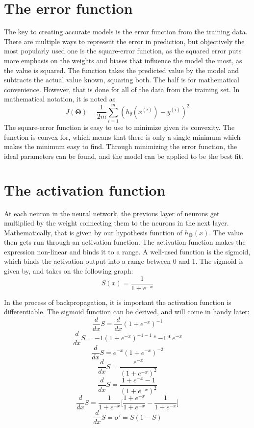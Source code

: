 \documentclass[a4paper,12pt]{article}
\begin{document}
\section{The error function}
The key to creating accurate models is the error function from the training data. There are multiple ways to represent the error in prediction, but objectively the most popularly used one is the square-error function, as the squared error puts more emphasis on the weights and biases that influence the model the most, as the value is squared. The function takes the predicted value by the model and subtracts the actual value known, squaring both. The half is for mathematical convenience. However, that is done for all of the data from the training set. In mathematical notation, it is noted as
\[J(\boldsymbol{\Theta}) = \frac{1}{2m} \sum_{i=1}^m (h_\theta(x^{(i)}) - y^{(i)})^2\]
The square-error function is easy to use to minimize given its convexity. The function is convex for, which means that there is only a single minimum which makes the minimum easy to find. Through minimizing the error function, the ideal parameters can be found, and the model can be applied to be the best fit.

\section{The activation function}
At each neuron in the neural network, the previous layer of neurons get multiplied by the weight connecting them to the neurons in the next layer. Mathematically, that is given by our hypothesis function of $h_{\boldsymbol{\Theta}}(x)$. The value then gets run through an activation function. The activation function makes the expression non-linear and binds it to a range. A well-used function is the sigmoid, which binds the activation output into a range between 0 and 1. The sigmoid is given by, and takes on the following graph:
\[S(x) = \frac{1}{1+e^{-x}}\]

In the process of backpropagation, it is important the activation function is differentiable. The sigmoid function can be derived, and will come in handy later:
\[\frac{d}{dx}S = \frac{d}{dx}(1+e^{-x})^{-1}\]
\[\frac{d}{dx}S = -1(1+e^{-x})^{-1-1} * -1 * e^{-x}\]
\[\frac{d}{dx}S = e^{-x}(1+e^{-x})^{-2}\]
\[\frac{d}{dx}S = \frac{e^{-x}}{(1+e^{-x})^2}\]
\[\frac{d}{dx}S = \frac{1 + e^{-x} - 1}{(1+e^{-x})^2}\]
\[\frac{d}{dx}S = \frac{1}{1+e^{-x}}\bigg[\frac{1+e^{-x}}{1+e^{-x}} - \frac{1}{1+e^{-x}}\bigg] \]
\[\frac{d}{dx}S = \sigma' = S(1-S)\]
\end{document}
